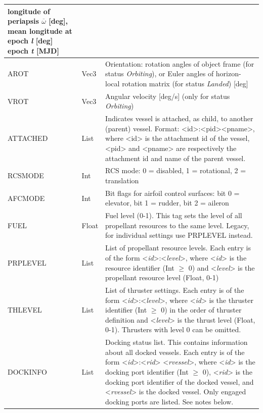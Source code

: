 \documentclass[Orbiter Developer Manual.tex]{subfiles}
\begin{document}
\begin{longtable}{ |p{}|p{}|p{}| }
	longitude of periapsis $\overline{\omega}$ [deg],\newline
	mean longitude at epoch \textit{l} [deg]\newline
	epoch \textit{t} [MJD]\\
	\hline\rule{0pt}{2ex}
	AROT & Vec3 & Orientation: rotation angles of object frame (for status \textit{Orbiting}), or Euler angles of horizon-local rotation matrix (for status \textit{Landed}) [deg]\\
	\hline\rule{0pt}{2ex}
	VROT & Vec3 & Angular velocity [deg/s] (only for status \textit{Orbiting})\\
	\hline\rule{0pt}{2ex}
	ATTACHED & List & Indicates vessel is attached, as child, to another (parent) vessel. Format: <id>:<pid><pname>, where <id> is the attachment id of the vessel, <pid> and <pname> are respectively the attachment id and name of the parent vessel.\\
	\hline\rule{0pt}{2ex}
	RCSMODE & Int & RCS mode: 0 = disabled, 1 = rotational, 2 = translation\\
	\hline\rule{0pt}{2ex}
	AFCMODE & Int & Bit flags for airfoil control surfaces: bit 0 = elevator, bit 1 = rudder, bit 2 = aileron\\
	\hline\rule{0pt}{2ex}
	FUEL & Float & Fuel level (0-1). This tag sets the level of all propellant resources to the same level. Legacy, for individual settings use PRPLEVEL instead.\\
	\hline\rule{0pt}{2ex}
	PRPLEVEL & List & List of propellant resource levels. Each entry is of the form <\textit{id}>:<\textit{level}>, where <\textit{id}> is the resource identifier (Int $\geq$ 0) and <\textit{level}> is the propellant resource level (Float, 0-1)\\
	\hline\rule{0pt}{2ex}
	THLEVEL & List & List of thruster settings. Each entry is of the form <\textit{id}>:<\textit{level}>, where <\textit{id}> is the thruster identifier (Int $\geq$ 0) in the order of thruster definition and <\textit{level}> is the thrust level (Float, 0-1). Thrusters with level 0 can be omitted.\\
	\hline\rule{0pt}{2ex}
	DOCKINFO & List & Docking status list. This contains information about all docked vessels. Each entry is of the form <\textit{id}>:<\textit{rid}> <\textit{rvessel}>, where <\textit{id}> is the docking port identifier (Int $\geq$ 0), <\textit{rid}> is the docking port identifier of the docked vessel, and <\textit{rvessel}> is the docked vessel. Only engaged docking ports are listed. See notes below.\\

\end{longtable}
\end{document}
